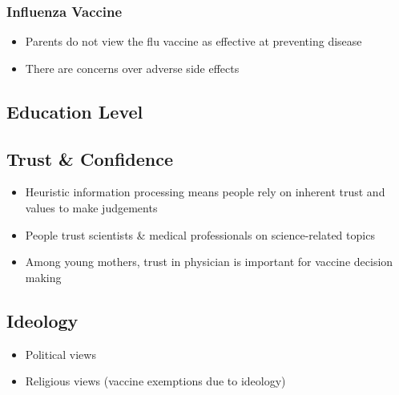 \documentclass[12pt,]{article}
\providecommand{\tightlist}{%
  \setlength{\itemsep}{0pt}\setlength{\parskip}{0pt}}
\begin{document}
\hypertarget{influenza-vaccine}{%
\subsubsection{Influenza Vaccine}\label{influenza-vaccine}}

\begin{itemize}
\tightlist
\item
  Parents do not view the flu vaccine as effective at preventing disease \autocite{cooper2011:flu}
\item
  There are concerns over adverse side effects \autocite{hart2019:flueffects}
\end{itemize}

\hypertarget{education-level}{%
\subsection{Education Level}\label{education-level}}

\hypertarget{trust-confidence}{%
\subsection{Trust \& Confidence}\label{trust-confidence}}

\begin{itemize}
\tightlist
\item
  Heuristic information processing means people rely on inherent trust and values to make judgements \autocite{scheufele2005:heuristic}
\item
  People trust scientists \& medical professionals on science-related topics \autocites{einsiedel1994:mentalmap}{sjoberg2002:techattitudes}
\item
  Among young mothers, trust in physician is important for vaccine decision making \autocite{benin2006:mothertrust}
\end{itemize}

\hypertarget{ideology}{%
\subsection{Ideology}\label{ideology}}

\begin{itemize}
\tightlist
\item
  Political views \autocite{scheufele2014:political}
\item
  Religious views (vaccine exemptions due to ideology) \autocites{allum2008:values}{brossard2007:deference}
\end{itemize}
\end{document}
